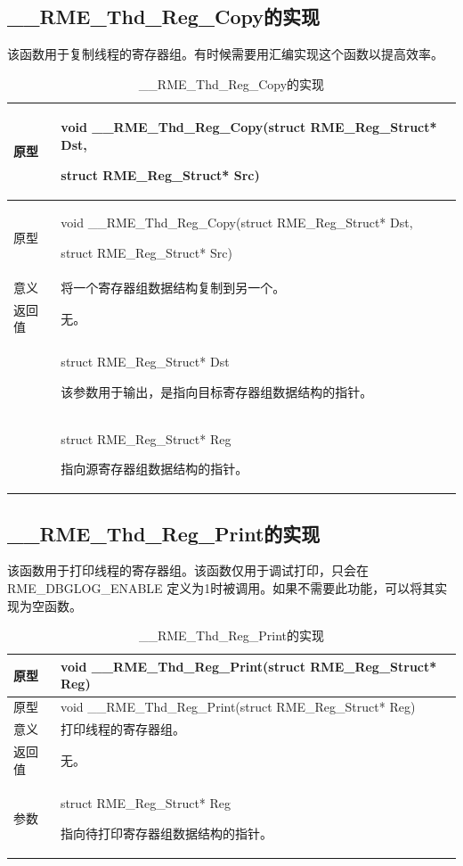 \subsection{\_\_RME\_Thd\_Reg\_Copy的实现}\label{subsec:7-rme-thd-reg-copy-implementation}

该函数用于复制线程的寄存器组。有时候需要用汇编实现这个函数以提高效率。

\begin{xltabular}{\textwidth}{@{}>{\hsize\raggedright\arraybackslash}X>{\hsize\raggedright\arraybackslash}X@{}}
\caption{\_\_RME\_Thd\_Reg\_Copy的实现}\label{tab:7-64-rme-thd-reg-copy-implementation}\\
\toprule
原型\strut
 & void \_\_RME\_Thd\_Reg\_Copy(struct RME\_Reg\_Struct* Dst,

struct RME\_Reg\_Struct* Src)\strut
\tabularnewline
\endfirsthead
\toprule
原型\strut
 & void \_\_RME\_Thd\_Reg\_Copy(struct RME\_Reg\_Struct* Dst,

struct RME\_Reg\_Struct* Src)\strut
\tabularnewline
\midrule
\endhead
\bottomrule
\endlastfoot
意义 & 将一个寄存器组数据结构复制到另一个。\tabularnewline
返回值 & 无。\tabularnewline
{} & struct RME\_Reg\_Struct* Dst

该参数用于输出，是指向目标寄存器组数据结构的指针。\strut
\tabularnewline
\strut
 & struct RME\_Reg\_Struct* Reg

指向源寄存器组数据结构的指针。\strut
\tabularnewline
\end{xltabular}

\subsection{\_\_RME\_Thd\_Reg\_Print的实现}\label{subsec:7-rme-thd-reg-print-implementation}

该函数用于打印线程的寄存器组。该函数仅用于调试打印，只会在 RME\_DBGLOG\_ENABLE 定义为1时被调用。如果不需要此功能，可以将其实现为空函数。

\begin{xltabular}{\textwidth}{@{}>{\hsize\raggedright\arraybackslash}X>{\hsize\raggedright\arraybackslash}X@{}}
\caption{\_\_RME\_Thd\_Reg\_Print的实现}\label{tab:7-65-rme-thd-reg-print-implementation}\\
\toprule
原型 & void \_\_RME\_Thd\_Reg\_Print(struct RME\_Reg\_Struct*
Reg)\tabularnewline
\endfirsthead
\toprule
原型 & void \_\_RME\_Thd\_Reg\_Print(struct RME\_Reg\_Struct*
Reg)\tabularnewline
\midrule
\endhead
\bottomrule
\endlastfoot
意义 & 打印线程的寄存器组。\tabularnewline
返回值 & 无。\tabularnewline
参数\strut
 & struct RME\_Reg\_Struct* Reg

指向待打印寄存器组数据结构的指针。\strut
\tabularnewline
\end{xltabular}

